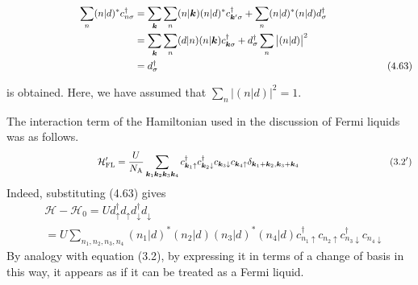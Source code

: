 \documentclass[a4j]{jarticle}
\begin{document}
\begin{align}
	\hspace{26mm}
	\sum_{n} ( n | d )^{*}
	c^{\dagger}_{n \sigma}
	 & =
	\sum_{\bm{k}}
	\sum_{n}
	( n | \bm{k} )
	( n | d )^{*}
	c^{\dagger}_{\bm{k}' \sigma}
	+
	\sum_{n} ( n | d )^{*}
	( n | d )
	d^{\dagger}_{\sigma}
	\nonumber \\ &=
	\sum_{\bm{k}}
	\sum_{n}
	( d | n )
	( n | \bm{k} )
	c^{\dagger}_{\bm{k} \sigma}
	+
	d^{\dagger}_{\sigma}
	\sum_{n}
	\big|
	( n | d )
	\big|^{2}
	\nonumber \\ &=
	d^{\dagger}_{\sigma}
	\nonumber
	\hspace{82mm}
	(4.63)
\end{align}

is obtained.
Here, we have assumed that $\displaystyle
	\sum_{n}
	\big|
	( n | d )
	\big|^{2}
	=1
$.


The interaction term of the Hamiltonian used in the discussion of Fermi liquids was as follows.
\begin{align}
	\hspace{33.5mm}
	\mathcal{H}'_{\rm FL}
	=
	\frac{U}{N_{\rm A}}
	\sum_{\bm{k}_{1} \bm{k}_{2} \bm{k}_{3} \bm{k}_{4}}
	c_{\bm{k}_{1} \uparrow}^{\dagger}
	c_{\bm{k}_{2} \downarrow}^{\dagger}
	c_{\bm{k}_{3} \downarrow}
	c_{\bm{k}_{4} \uparrow}
	\delta_{\bm{k}_{1}+\bm{k}_{2} , \bm{k}_{3}+\bm{k}_{4}}
	\nonumber
	\hspace{33.5mm}
	(3.2')
\end{align}
Indeed, substituting (4.63) gives
\begin{align}
	&
	\mathcal{H} - \mathcal{H}_{0}
	=
	U
	d_{\uparrow}^{\dagger}
	d_{\uparrow}
	d_{\downarrow}^{\dagger}
	d_{\downarrow}
	\nonumber \\
	&=
	U
	\sum_{n_{1},n_{2},n_{3},n_{4}}
	(n_{1} | d)^{*}
	(n_{2} | d)
	(n_{3} | d)^{*}
	(n_{4} | d)
	c_{n_{1} \uparrow}^{\dagger}
	c_{n_{2} \uparrow}
	c_{n_{3} \downarrow}^{\dagger}
	c_{n_{4} \downarrow}
\end{align}
By analogy with equation (3.2), by expressing it in terms of a change of basis in this way, it appears as if it can be treated as a Fermi liquid.

${}$
\end{document}
